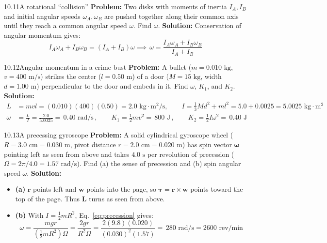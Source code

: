 \documentclass[11pt,a4paper,openany,oneside]{book}
\newcommand{\eqbox}[1]{\boxed{\,#1\,}}
\newcommand{\vect}[1]{\mathbf{#1}}
\numberwithin{equation}{chapter}
\newcommand{\bk}[1]{\texorpdfstring{\enspace{\normalfont\small\color{slate}[Book #1]}}{ [Book #1]}}
\begin{document}
\begin{example}{10.11}{A rotational ``collision''\bk{p.\ 326}}
\textbf{Problem:} Two disks with moments of inertia $I_A, I_B$ and initial angular speeds $\omega_A, \omega_B$ are pushed together along their common axis until they reach a common angular speed $\omega$. Find $\omega$.
\tcblower
\textbf{Solution:} Conservation of angular momentum gives:
\begin{equation*}
  I_A\omega_A + I_B\omega_B = (I_A + I_B)\omega \implies \eqbox{\omega = \frac{I_A\omega_A + I_B\omega_B}{I_A + I_B}}
\end{equation*}
\end{example}

\begin{example}{10.12}{Angular momentum in a crime bust\bk{p.\ 327}}
\textbf{Problem:} A bullet ($m = 0.010\text{ kg}$, $v = 400\text{ m/s}$) strikes the center ($l = 0.50\text{ m}$) of a door ($M = 15\text{ kg}$, width $d = 1.00\text{ m}$) perpendicular to the door and embeds in it. Find $\omega$, $K_1$, and $K_2$.
\tcblower
\textbf{Solution:}
\begin{align*}
  L &= mvl = (0.010)(400)(0.50) = 2.0\text{ kg}\cdot\text{m}^2/\text{s}, \qquad I = \frac{1}{3}Md^2 + ml^2 = 5.0 + 0.0025 = 5.0025\text{ kg}\cdot\text{m}^2\\
  \omega &= \frac{L}{I} = \frac{2.0}{5.0025} = \eqbox{0.40\text{ rad/s}}, \qquad K_1 = \frac{1}{2}mv^2 = \eqbox{800\text{ J}}, \qquad K_2 = \frac{1}{2}I\omega^2 = \eqbox{0.40\text{ J}}
\end{align*}
\end{example}

\begin{example}{10.13}{A precessing gyroscope\bk{p.\ 330}}
\textbf{Problem:} A solid cylindrical gyroscope wheel ($R = 3.0\text{ cm} = 0.030\text{ m}$, pivot distance $r = 2.0\text{ cm} = 0.020\text{ m}$) has spin vector $\bm{\omega}$ pointing left as seen from above and takes $4.0\text{ s}$ per revolution of precession ($\Omega = 2\pi/4.0 = 1.57\text{ rad/s}$). Find (a) the sense of precession and (b) spin angular speed $\omega$.
\tcblower
\textbf{Solution:}
\begin{itemize}
  \item \textbf{(a)} $\vect{r}$ points left and $\vect{w}$ points into the page, so $\bm{\tau} = \vect{r}\times\vect{w}$ points toward the top of the page. Thus $\vect{L}$ turns \eqbox{\text{clockwise}} as seen from above.
  \item \textbf{(b)} With $I = \frac{1}{2}mR^2$, Eq.\ \eqref{eq:precession} gives:
  \begin{equation*}
    \omega = \frac{mgr}{\left(\frac{1}{2}mR^2\right)\Omega} = \frac{2gr}{R^2\Omega} = \frac{2(9.8)(0.020)}{(0.030)^2(1.57)} = \eqbox{280\text{ rad/s} = 2600\text{ rev/min}}
  \end{equation*}
\end{itemize}
\end{example}
\end{document}
